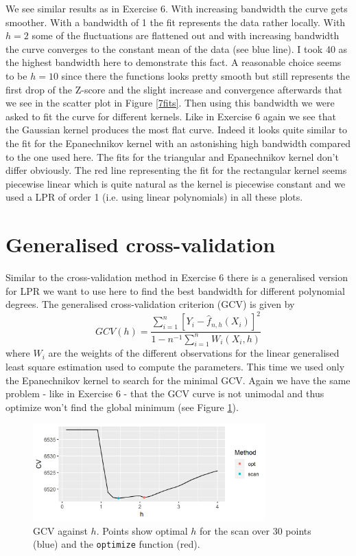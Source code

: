 We see similar results as in Exercise 6. With increasing bandwidth the curve gets smoother. With a bandwidth of 1 the fit represents the data rather locally. With $h=2$ some of the fluctuations are flattened out and with increasing bandwidth the curve converges to the constant mean of the data (see blue line). I took 40 as the highest bandwidth here to demonstrate this fact. A reasonable choice seems to be $h=10$ since there the functions looks pretty smooth but still represents the first drop of the Z-score and the slight increase and convergence afterwards that we see in the scatter plot in Figure \ref{7fits}. Then using this bandwidth we were asked to fit the curve for different kernels. Like in Exercise 6 again we see that the Gaussian kernel produces the most flat curve. Indeed it looks quite similar to the fit for the Epanechnikov kernel with an astonishing high bandwidth compared to the one used here. The fits for the triangular and Epanechnikov kernel don't differ obviously. The red line representing the fit for the rectangular kernel seems piecewise linear which is quite natural as the kernel is piecewise constant and we used a LPR of order 1 (i.e. using linear polynomials) in all these plots.  

\section{Generalised cross-validation}
Similar to the cross-validation method in Exercise 6 there is a generalised version for LPR we want to use here to find the best bandwidth for different polynomial degrees. The generalised cross-validation criterion (GCV) is given by $$GCV(h)=\frac{\sum_{i=1}^{n}{\left[Y_i-\hat{f}_{n,h}(X_i)\right]^2}}{1-n^{-1}\sum_{i=1}^{n} W_{i}(X_i,h)}$$ where $W_i$ are the weights of the different observations for the linear generalised least square estimation used to compute the parameters. This time we used only the Epanechnikov kernel to search for the minimal GCV. Again we have the same problem - like in Exercise 6 - that the GCV curve is not unimodal and thus optimize won't find the global minimum (see Figure \ref{7opth}). 
\begin{figure}[!bht]
\centering
\includegraphics[width=0.8\textwidth, keepaspectratio]{ex9/opth.png}
\caption{GCV against $h$. Points show optimal $h$ for the scan over 30 points (blue) and the \texttt{optimize} function (red).}
\label{7opth}
\end{figure}

